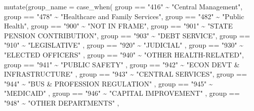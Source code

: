 \documentclass[
  letterpaper,
  DIV=11,
  numbers=noendperiod]{scrreport}
\newenvironment{Shaded}{\begin{snugshade}}{\end{snugshade}}
\newcommand{\AttributeTok}[1]{\textcolor[rgb]{0.40,0.45,0.13}{#1}}
\newcommand{\FunctionTok}[1]{\textcolor[rgb]{0.28,0.35,0.67}{#1}}
\newcommand{\NormalTok}[1]{\textcolor[rgb]{0.00,0.23,0.31}{#1}}
\newcommand{\SpecialCharTok}[1]{\textcolor[rgb]{0.37,0.37,0.37}{#1}}
\newcommand{\StringTok}[1]{\textcolor[rgb]{0.13,0.47,0.30}{#1}}
\begin{document}
\begin{Shaded}
\begin{Highlighting}[]
  \FunctionTok{mutate}\NormalTok{(}\AttributeTok{group\_name =} 
           \FunctionTok{case\_when}\NormalTok{(}
\NormalTok{             group }\SpecialCharTok{==} \StringTok{"416"} \SpecialCharTok{\textasciitilde{}} \StringTok{"Central Management"}\NormalTok{,}
\NormalTok{             group }\SpecialCharTok{==} \StringTok{"478"} \SpecialCharTok{\textasciitilde{}} \StringTok{"Healthcare and Family Services"}\NormalTok{,}
\NormalTok{             group }\SpecialCharTok{==} \StringTok{"482"} \SpecialCharTok{\textasciitilde{}} \StringTok{"Public Health"}\NormalTok{,}
\NormalTok{             group }\SpecialCharTok{==} \StringTok{"900"} \SpecialCharTok{\textasciitilde{}} \StringTok{"NOT IN FRAME"}\NormalTok{,}
\NormalTok{             group }\SpecialCharTok{==} \StringTok{"901"} \SpecialCharTok{\textasciitilde{}} \StringTok{"STATE PENSION CONTRIBUTION"}\NormalTok{,}
\NormalTok{             group }\SpecialCharTok{==} \StringTok{"903"} \SpecialCharTok{\textasciitilde{}} \StringTok{"DEBT SERVICE"}\NormalTok{,}
\NormalTok{             group }\SpecialCharTok{==} \StringTok{"910"} \SpecialCharTok{\textasciitilde{}} \StringTok{"LEGISLATIVE"}\NormalTok{  ,}
\NormalTok{             group }\SpecialCharTok{==} \StringTok{"920"} \SpecialCharTok{\textasciitilde{}} \StringTok{"JUDICIAL"}\NormalTok{ ,}
\NormalTok{             group }\SpecialCharTok{==} \StringTok{"930"} \SpecialCharTok{\textasciitilde{}} \StringTok{"ELECTED OFFICERS"}\NormalTok{ , }
\NormalTok{             group }\SpecialCharTok{==} \StringTok{"940"} \SpecialCharTok{\textasciitilde{}} \StringTok{"OTHER HEALTH{-}RELATED"}\NormalTok{, }
\NormalTok{             group }\SpecialCharTok{==} \StringTok{"941"} \SpecialCharTok{\textasciitilde{}} \StringTok{"PUBLIC SAFETY"}\NormalTok{ ,}
\NormalTok{             group }\SpecialCharTok{==} \StringTok{"942"} \SpecialCharTok{\textasciitilde{}} \StringTok{"ECON DEVT \& INFRASTRUCTURE"}\NormalTok{ ,}
\NormalTok{             group }\SpecialCharTok{==} \StringTok{"943"} \SpecialCharTok{\textasciitilde{}} \StringTok{"CENTRAL SERVICES"}\NormalTok{,}
\NormalTok{             group }\SpecialCharTok{==} \StringTok{"944"} \SpecialCharTok{\textasciitilde{}} \StringTok{"BUS \& PROFESSION REGULATION"}\NormalTok{ ,}
\NormalTok{             group }\SpecialCharTok{==} \StringTok{"945"} \SpecialCharTok{\textasciitilde{}} \StringTok{"MEDICAID"}\NormalTok{ ,}
\NormalTok{             group }\SpecialCharTok{==} \StringTok{"946"} \SpecialCharTok{\textasciitilde{}} \StringTok{"CAPITAL IMPROVEMENT"}\NormalTok{ , }
\NormalTok{             group }\SpecialCharTok{==} \StringTok{"948"} \SpecialCharTok{\textasciitilde{}} \StringTok{"OTHER DEPARTMENTS"}\NormalTok{ ,}

\end{Highlighting}
\end{Shaded}
\end{document}
